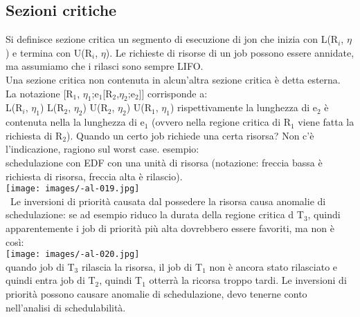 \documentclass{article}
\begin{document}
\subsection{Sezioni critiche}
Si definisce sezione critica un segmento di esecuzione di jon che inizia con L(R$_{i}$, $\eta$) e termina con U(R$_{i}$, $\eta$). Le richieste di risorse di un job possono essere annidate, ma assumiamo che i rilasci sono sempre LIFO.\\ Una sezione critica non contenuta in alcun'altra sezione critica è detta esterna.\\ La notazione [R$_{1}$, $\eta_1$;e$_{1}$[R$_{2}$,$\eta_2$;e$_{2}$]] corrisponde a:\\ L(R$_{i}$, $\eta_1$) L(R$_{2}$, $\eta_2$) U(R$_{2}$, $\eta_2$) U(R$_{1}$, $\eta_1$) rispettivamente la lunghezza di e$_{2}$ è contenuta nella la lunghezza di e$_{1}$ (ovvero nella regione critica di R$_{1}$ viene fatta la richiesta di R$_{2}$). Quando un certo job richiede una certa risorsa? Non c'è l'indicazione, ragiono sul worst case. esempio:\\
schedulazione con EDF con una unità di risorsa (notazione: freccia bassa è richiesta di risorsa, freccia alta è rilascio).\\
\texttt{[image: images/-al-019.jpg]}\\\
Le inversioni di priorità causata dal possedere la risorsa causa anomalie di schedulazione: se ad esempio riduco la durata della regione critica d T$_{3}$, quindi apparentemente i job di priorità più alta dovrebbero essere favoriti, ma non è così:\\ 
\texttt{[image: images/-al-020.jpg]}\\
quando job di T$_{3}$ rilascia la risorsa, il job di T$_{1}$ non è ancora stato rilasciato e quindi entra job di T$_{2}$, quindi T$_{1}$ otterrà la ricorsa troppo tardi. Le inversioni di priorità possono causare anomalie di schedulazione, devo tenerne conto nell'analisi di schedulabilità.
\end{document}
